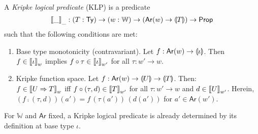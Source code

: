 \documentclass[a4paper]{article}
\newcommand{\WW}{\mathbb{W}}
\newcommand{\tAr}{\mathsf{Ar}}
\newcommand{\Ar}[1]{\tAr(#1)}
\begin{document}
A \emph{Kripke logical predicate} (KLP) is a predicate
\[
  \Den\_\_ : (T : \Ty) \to (w : \WW) \to (\Ar w \to \denty T) \to
  \Prop
\]
such that the following conditions are met:
\begin{enumerate}
\item Base type monotonicity (contravariant).
  Let $f : \Ar w \to \denty \iota$.  Then\\
  $f \in \mathopen{{[\kern-0.14em[}} \iota \mathclose{{]\kern-0.14em]}}_{w}$ implies $f \circ \tau \in \mathopen{{[\kern-0.14em[}} \iota \mathclose{{]\kern-0.14em]}}_{w'}$ for all
  $\tau : w' \to w$.
\item Kripke function space. Let $f : \Ar w \to \denty {U} \to
  \denty{T}$.  Then: \\
  $f \in \mathopen{{[\kern-0.14em[}} U \Rightarrow T \mathclose{{]\kern-0.14em]}}_{w}$ iff $f \circ (\tau,d) \in \mathopen{{[\kern-0.14em[}} T \mathclose{{]\kern-0.14em]}}_{w'}$ for all
  $\tau : w' \to w$ and $d \in \mathopen{{[\kern-0.14em[}} U \mathclose{{]\kern-0.14em]}}_{w'}$.
  Herein, $(f \comp (\tau,d))(a') = f\,(\tau(a'))\,(d(a'))$ for $a'
  \in \Ar{w'}$.
\end{enumerate}
For $\WW$ and $\tAr$ fixed, a Kripke logical predicate is already
determined by its definition at base type $\iota$.
\end{document}
